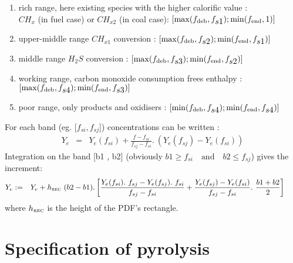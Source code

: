 \begin{enumerate}
\item rich range, here existing species with the higher calorific value : \\
  \hspace{0.25cm}$CH_{x}$ (in fuel case) or $CH_{x2}$ (in coal case):
  $[\max(f_{\mbox{\scriptsize deb}},f_{\displaystyle s1}) ;
  \min(f_{\mbox{\scriptsize end}},1)]$
\item upper-middle range $CH_{x1}$ conversion : $[\max(f_{\mbox{\scriptsize
      deb}},f_{\displaystyle s2} ); \min (f_{\mbox{\scriptsize
      end}},f_{\displaystyle s1})]$
\item middle range $H_{2}S$ conversion : $[\max(f_{\mbox{\scriptsize
      deb}},f_{\displaystyle s3} ); \min (f_{\mbox{\scriptsize
      end}},f_{\displaystyle s2})]$
\item working range, carbon monoxide consumption frees enthalpy :
  $[\max(f_{\mbox{\scriptsize deb}},f_{\displaystyle s4} ); \min
  (f_{\mbox{\scriptsize end}},f_{\displaystyle s3})]$
\item poor range, only products and oxidisers : $[\min(f_{\mbox{\scriptsize
      deb}},f_{\displaystyle s4} ); \min (f_{\mbox{\scriptsize
      end}},f_{\displaystyle s4})]$
\end{enumerate}
For each band (eg. [$f_{\displaystyle si} , f_{\displaystyle sj}$])
concentrations can be written :
\begin{eqnarray}
  \displaystyle Y_e & = & Y_{e}(f_{\displaystyle si}) + \frac{f-f_{\displaystyle si}}{f_{\displaystyle sj}-f_{\displaystyle si}} .~ \left( Y_{e}(f_{\displaystyle sj})-Y_{e}(f_{\displaystyle si}) \right) 
\end{eqnarray}
Integration on the band [b1 , b2] (obviously $b1 \geq f_{si} \quad \text{and}
\quad b2 \leq f_{sj}$) gives the increment:
\begin{eqnarray}
  \displaystyle Y_{e} & := & Y_e + h_{\mbox{\scriptsize \textsc{rec}}}~(b2-b1)  .  \left[ \frac{Y_{e}(f_{si}).~f_{sj}-Y_{e}(f_{sj}).~f_{si}}{f_{sj}-f_{si}}
    \displaystyle                                  +         \frac{Y_{e}(f_{sj})-Y_{e}(f_{si})}{f_{sj}-f_{si}}.~\frac{b1+b2}{2} \right] \qquad
\end{eqnarray}
where $h_{\mbox{\scriptsize \textsc{rec}}}$ is the height of the PDF's
rectangle.

\section{Specification of pyrolysis}

